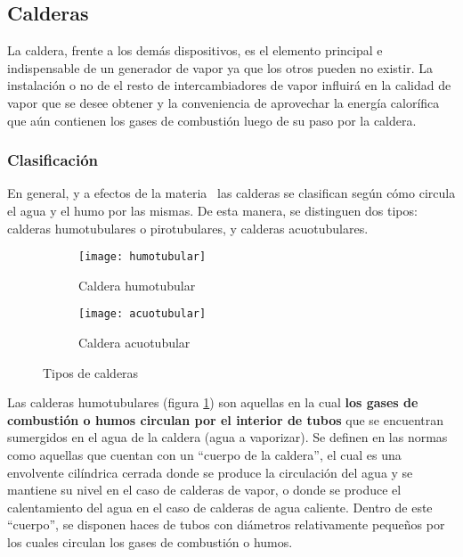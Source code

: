 \subsection{Calderas}

La caldera, frente a los demás dispositivos, es el elemento principal e indispensable de un generador de vapor ya que los otros pueden no existir. La instalación o no de el resto de intercambiadores de vapor influirá en la calidad de vapor que se desee obtener y la conveniencia de aprovechar la energía calorífica que aún contienen los gases de combustión luego de su paso por la caldera.

\subsubsection{Clasificación}

En general, y a efectos de la materia \materia\ las calderas se clasifican según cómo circula el agua y el humo por las mismas. De esta manera, se distinguen dos tipos: calderas humotubulares o pirotubulares, y calderas acuotubulares.

\begin{figure}[!h]
	\centering
	\begin{subfigure}[b]{.4\linewidth}
		\texttt{[image: humotubular]}
		\caption{Caldera humotubular}
		\label{fig:caldera-humo}
	\end{subfigure}
	\begin{subfigure}[b]{.4\linewidth}
		\texttt{[image: acuotubular]}
		\caption{Caldera acuotubular}
		\label{fig:caldera-acuo}
	\end{subfigure}
	\caption{Tipos de calderas}
\end{figure}


Las calderas humotubulares (figura \ref{fig:caldera-humo}) son aquellas en la cual \textbf{los gases de combustión o humos circulan por el interior de tubos} que se encuentran sumergidos en el agua de la caldera (agua a vaporizar). Se definen en las normas como aquellas que cuentan con un ``cuerpo de la caldera'', el cual es una envolvente cilíndrica cerrada donde se produce la circulación del agua y se mantiene su nivel en el caso de calderas de vapor, o donde se produce el calentamiento del agua en el caso de calderas de agua caliente. Dentro de este ``cuerpo'', se disponen haces de tubos con diámetros relativamente pequeños por los cuales circulan los gases de combustión o humos.\\


